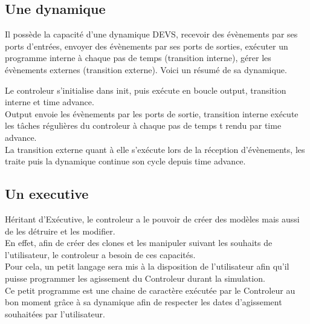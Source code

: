 \subsection{Une dynamique}
Il possède la capacité d'une dynamique DEVS, recevoir des évènements par ses ports d'entrées, envoyer des évènements par ses ports de sorties, exécuter un programme interne à chaque pas de temps (transition interne), gérer les évènements externes (transition externe). Voici un résumé de sa dynamique. \\
\begin{minipage}{\linewidth}%
\end{minipage}

Le controleur s'initialise dans init, puis exécute en boucle output, transition interne et time advance. \\
Output envoie les évènements par les ports de sortie, transition interne exécute les tâches régulières du controleur à chaque pas de temps t rendu par time advance.\\
La transition externe quant à elle s'exécute lors de la réception d'évènements, les traite puis la dynamique continue son cycle depuis time advance.

\subsection{Un executive}
Héritant d'Exécutive, le controleur a le pouvoir de créer des modèles mais aussi de les détruire et les modifier.\\
En effet, afin de créer des clones et les manipuler suivant les souhaits de l'utilisateur, le controleur a besoin de ces capacités.\\
Pour cela, un petit langage sera mis à la disposition de l'utilisateur afin qu'il puisse programmer les agissement du Controleur durant la simulation. \\
Ce petit programme est une chaine de caractère exécutée par le Controleur au bon moment grâce à sa dynamique afin de respecter les dates d'agissement souhaitées par l'utilisateur.

